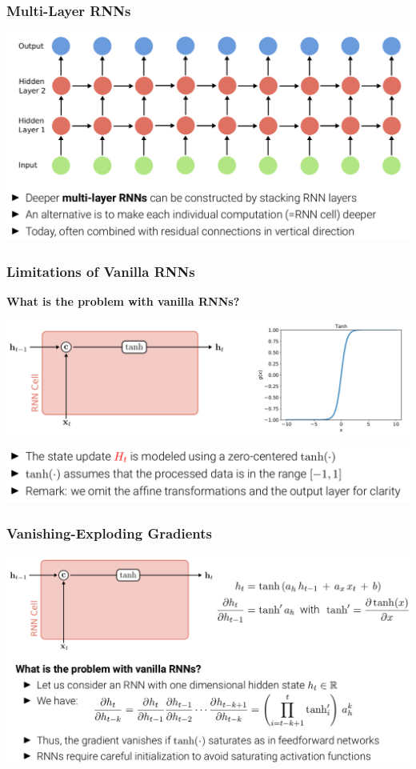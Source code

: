 \documentclass[10pt]{beamer}
\begin{document}
\begin{frame}
  \frametitle{Multi-Layer RNNs}
\begin{center}
\includegraphics[width=\textwidth]{images/s10}
\end{center}
\end{frame}

\begin{frame}
  \frametitle{Limitations of Vanilla RNNs}
\textbf{What is the problem with vanilla RNNs?}
\begin{center}
\includegraphics[width=\textwidth]{images/s11}
\end{center}
\vspace{-.25cm}
\begin{center}
\includegraphics[width=\textwidth]{images/s12}
\end{center}
\end{frame}

\begin{frame}
  \frametitle{Vanishing-Exploding Gradients}
\begin{center}
\includegraphics[width=\textwidth]{images/s13}
\end{center}
\end{frame}
\end{document}
